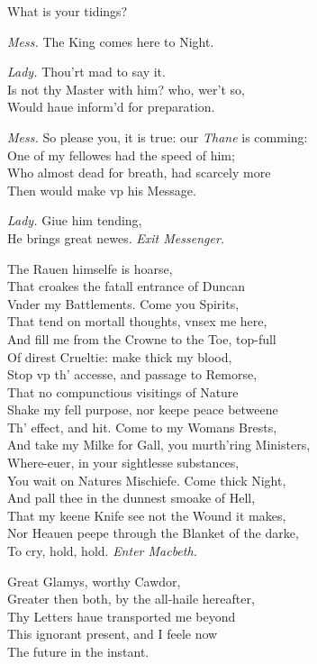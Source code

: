 \documentclass[12pt]{sides}
\newcommand{\dia}[1]{\hskip 15pt\textit{#1}\hskip 6pt}
\begin{document}
\begin{multicols}{2}
            What is your tidings?

            \dia{Mess.} The King comes here to Night.

            \dia{Lady.} Thou'rt mad to say it. \\ Is not thy Master with him? who, wer't so, \\ Would haue inform'd for preparation.

            \dia{Mess.} So please you, it is true: our \textit{Thane} is comming: \\ One of my fellowes had the speed of him; \\ Who almost dead for breath, had scarcely more \\ Then would make vp his Message.

            \dia{Lady.} Giue him tending, \\ He brings great newes. \hfill \textit{Exit Messenger.}

            The Rauen himselfe is hoarse, \\ That croakes the fatall entrance of Duncan \\ Vnder my Battlements. Come you Spirits, \\ That tend on mortall thoughts, vnsex me here, \\ And fill me from the Crowne to the Toe, top-full \\ Of direst Crueltie: make thick my blood, \\ Stop vp th' accesse, and passage to Remorse, \\ That no compunctious visitings of Nature \\ Shake my fell purpose, nor keepe peace betweene \\ Th' effect, and hit. Come to my Womans Brests, \\ And take my Milke for Gall, you murth'ring Ministers, \\ Where-euer, in your sightlesse substances, \\ You wait on Natures Mischiefe. Come thick Night, \\ And pall thee in the dunnest smoake of Hell, \\ That my keene Knife see not the Wound it makes, \\ Nor Heauen peepe through the Blanket of the darke, \\ To cry, hold, hold. \hfill \textit{Enter Macbeth.}

            Great Glamys, worthy Cawdor, \\ Greater then both, by the all-haile hereafter, \\ Thy Letters haue transported me beyond \\ This ignorant present, and I feele now \\ The future in the instant.


\end{multicols}
\end{document}
